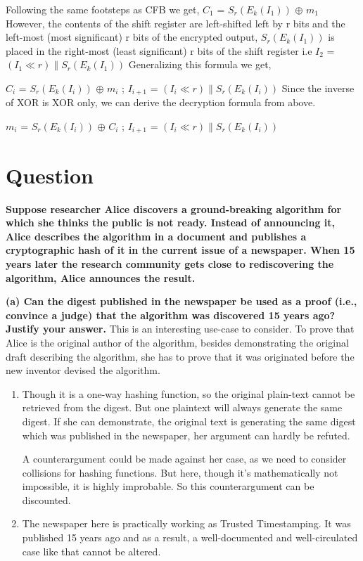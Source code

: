\documentclass{article}
\begin{document}
Following the same footsteps as CFB we get, $C_1$ = $S_r(E_k(I_1))$ $\oplus$ $m_1$
\newline \newline However, the contents of the shift register are left-shifted left by r bits and the left-most (most significant) r bits of the encrypted output,  $S_r(E_k(I_1))$ is placed in the right-most (least significant) r bits of the shift register i.e $I_2$ = $ (I_1 \ll r) \| S_r(E_k(I_1))$
\newline \newline Generalizing this formula we get,

$C_i$ = $S_r(E_k(I_i))$ $\oplus$ $m_i$ ; $I_{i+1}$ = $ (I_i \ll r) \| S_r(E_k(I_i))$ 
\newline \newline Since the inverse of XOR is XOR only, we can derive the decryption formula from above.

$m_i$ = $S_r(E_k(I_i))$ $\oplus$ $C_i$ ; $I_{i+1}$ = $ (I_i \ll r) \| S_r(E_k(I_i))$ 



\section{Question}

\textbf{Suppose researcher Alice discovers a ground-breaking algorithm for which she thinks the public is not ready. Instead of announcing it, Alice describes the algorithm in a document and publishes a cryptographic hash of it in the current issue of a newspaper. When 15 years later the research community gets close to rediscovering the algorithm, Alice announces the result.}

\textbf{(a) Can the digest published in the newspaper be used as a proof (i.e., convince a judge) that the algorithm was discovered 15 years ago? Justify your answer.}
\newline \newline This is an interesting use-case to consider. To prove that Alice is the original author of the algorithm, besides demonstrating the original draft describing the algorithm, she has to prove that it was originated before the new inventor devised the algorithm.

\begin{enumerate}
\item Though it is a one-way hashing function, so the original plain-text cannot be retrieved from the digest. But one plaintext will always generate the same digest. If she can demonstrate, the original text is generating the same digest which was published in the newspaper, her argument can hardly be refuted.

A counterargument could be made against her case, as we need to consider collisions for hashing functions. But here, though it's mathematically not impossible, it is highly improbable. So this counterargument can be discounted.

\item The newspaper here is practically working as Trusted Timestamping. It was published 15 years ago and as a result, a well-documented and well-circulated case like that cannot be altered.
\end{enumerate}
\end{document}
